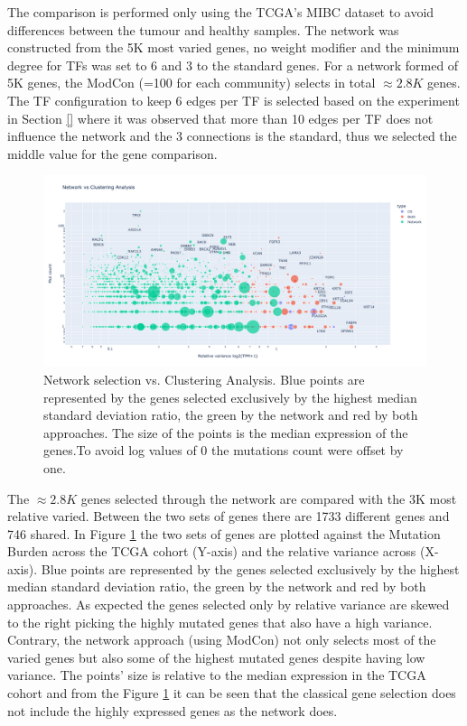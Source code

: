 The comparison is performed only using the TCGA's MIBC dataset to avoid differences between the tumour and healthy samples. The network was constructed from the 5K most varied genes, no weight modifier and the minimum degree for TFs  was set to 6 and 3 to the standard genes. For a network formed of 5K genes, the ModCon (=100 for each community) selects in total $\approx2.8K$ genes. The TF configuration to keep 6 edges per TF is selected based on the experiment in Section \ref{} where it was observed that more than 10 edges per TF does not influence the network and the 3 connections is the standard, thus we selected the middle value for the gene comparison.


\begin{figure}[!htb]    \centering\includegraphics[width=1.0\textwidth,height=0.7\textheight,keepaspectratio]{Sections/Network_I/Resources/Tum_network/ClusteringAnalysis_vs_Network_3.png}
    \caption{Network selection vs. Clustering Analysis. Blue points are represented by the genes selected exclusively by the highest median standard deviation ratio, the green by the network and red by both approaches. The size of the points is the median expression of the genes.To avoid log values of 0 the mutations count were offset by one.}
    \label{fig:N_I:network_ca_selection}
\end{figure}


The $\approx2.8K$ genes selected through the network are compared with the 3K most relative varied. Between the two sets of genes there are 1733 different genes and 746 shared. In Figure \ref{fig:N_I:network_ca_selection} the two sets of genes are plotted against the Mutation Burden across the TCGA cohort (Y-axis) and the relative variance across (X-axis). Blue points are represented by the genes selected exclusively by the highest median standard deviation ratio, the green by the network and red by both approaches. As expected the genes selected only by relative variance are skewed to the right picking the highly mutated genes that also have a high variance. Contrary, the network approach (using ModCon) not only selects most of the varied genes but also some of the highest mutated genes despite having low variance. The points' size is relative to the median expression in the TCGA cohort and from the Figure \ref{fig:N_I:network_ca_selection} it can be seen that the classical gene selection does not include the highly expressed genes as the network does.

